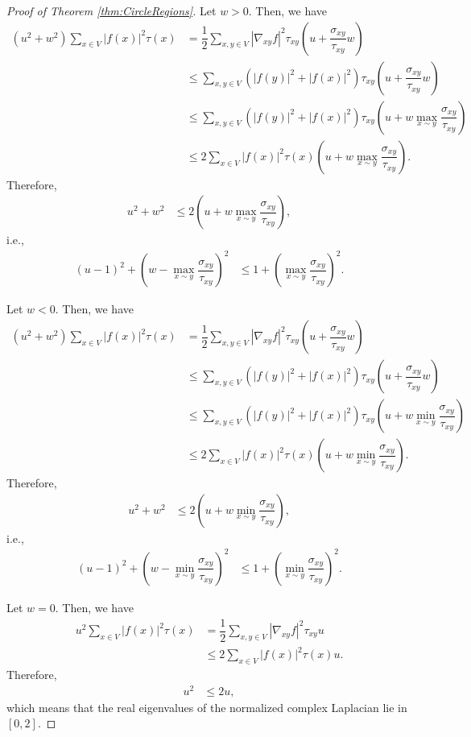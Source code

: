 \documentclass[a4paper,11pt]{amsart}
\theoremstyle{definition}
\begin{document}
\begin{proof}[Proof of Theorem \ref{thm:CircleRegions}]
Let $w>0$.
Then, we have
\begin{align*}
(u^2+w^2)\sum_{x\in V}|f(x)|^2\tau(x)&=\dfrac{1}{2}\sum_{x,y\in V}|\nabla_{xy}f|^2\tau_{xy}(u+\dfrac{\sigma_{xy}}{\tau_{xy}}w)\\
&\le \sum_{x,y\in V}(|f(y)|^2+|f(x)|^2)\tau_{xy}(u+\dfrac{\sigma_{xy}}{\tau_{xy}}w) \\
&\le \sum_{x,y\in V}(|f(y)|^2+|f(x)|^2)\tau_{xy}(u+w\max_{x\sim y}\dfrac{\sigma_{xy}}{\tau_{xy}}) \\
&\le 2\sum_{x\in V}|f(x)|^2\tau(x)(u+w\max_{x\sim y}\dfrac{\sigma_{xy}}{\tau_{xy}}) .
\end{align*}
Therefore,
\begin{align*}
u^2+w^2&\le 2(u+w\max_{x\sim y}\dfrac{\sigma_{xy}}{\tau_{xy}}) ,
\end{align*}
i.e.,
\begin{align*}
(u-1)^2+\left(w-\max_{x\sim y}\dfrac{\sigma_{xy}}{\tau_{xy}}\right)^2&\le 1+\left(\max_{x\sim y}\dfrac{\sigma_{xy}}{\tau_{xy}}\right)^2.
\end{align*}

Let $w<0$.
Then, we have
\begin{align*}
(u^2+w^2)\sum_{x\in V}|f(x)|^2\tau(x)&=\dfrac{1}{2}\sum_{x,y\in V}|\nabla_{xy}f|^2\tau_{xy}(u+\dfrac{\sigma_{xy}}{\tau_{xy}}w)\\
&\le \sum_{x,y\in V}(|f(y)|^2+|f(x)|^2)\tau_{xy}(u+\dfrac{\sigma_{xy}}{\tau_{xy}}w) \\
&\le \sum_{x,y\in V}(|f(y)|^2+|f(x)|^2)\tau_{xy}(u+w\min_{x\sim y}\dfrac{\sigma_{xy}}{\tau_{xy}}) \\
&\le 2\sum_{x\in V}|f(x)|^2\tau(x)(u+w\min_{x\sim y}\dfrac{\sigma_{xy}}{\tau_{xy}}) .
\end{align*}
Therefore,
\begin{align*}
u^2+w^2&\le 2(u+w\min_{x\sim y}\dfrac{\sigma_{xy}}{\tau_{xy}}) ,
\end{align*}
i.e.,
\begin{align*}
(u-1)^2+\left(w-\min_{x\sim y}\dfrac{\sigma_{xy}}{\tau_{xy}}\right)^2&\le 1+\left(\min_{x\sim y}\dfrac{\sigma_{xy}}{\tau_{xy}}\right)^2.
\end{align*}

Let $w=0$.
Then, we have
\begin{align*}
u^2\sum_{x\in V}|f(x)|^2\tau(x)&=\dfrac{1}{2}\sum_{x,y\in V}|\nabla_{xy}f|^2\tau_{xy}u\\
&\le 2\sum_{x\in V}|f(x)|^2\tau(x)u .
\end{align*}
Therefore,
\begin{align*}
u^2&\le 2u,
\end{align*}
which means that the real eigenvalues of the normalized complex Laplacian lie in $[0,2]$.


\end{proof}
\end{document}
